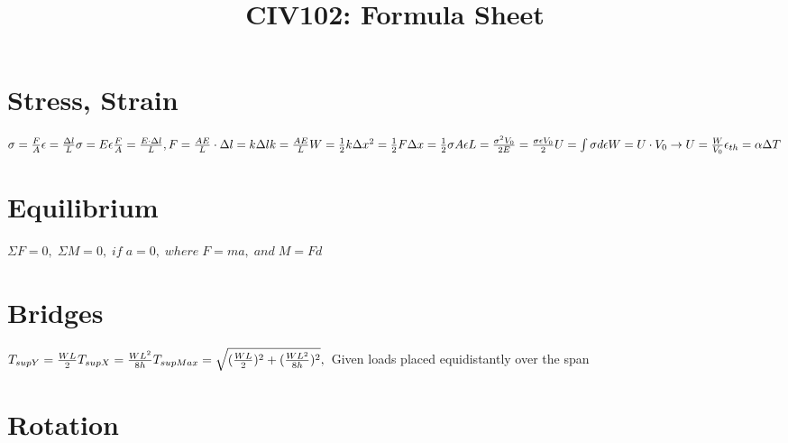 \documentclass{article}
\begin{document}
    \title{CIV102: Formula Sheet}

    \section{Stress, Strain}
        \begin{math} 
            \sigma = \frac{F}{A} \\
            \epsilon = \frac{\Delta l}{L} \\
            \sigma = E\epsilon  \\
            \frac{F}{A} = \frac{E \cdot \Delta l}{L}, F = \frac{AE}{L} \cdot \Delta l = k \Delta l  \\
            k = \frac{AE}{L}  \\
            W = \frac{1}{2}k\Delta x^2 
            = \frac{1}{2} F\Delta x 
            = \frac{1}{2} \sigma A \epsilon L 
            = \frac{\sigma^2 V_0}{2E} 
            = \frac{\sigma \epsilon V_0}{2}\\ 
            U = \int \sigma d\epsilon \\
            W = U \cdot V_0 \rightarrow U = \frac{W}{V_0} \\
            \epsilon_{th} = \alpha \Delta T 
        \end{math}

    \section{Equilibrium}  
        \begin{math}
            \Sigma F = 0,\;\Sigma M = 0,\;if\;a = 0,\;where\;F = ma,\;and\;M = Fd
        \end{math}
    
    \section{Bridges}
        \begin{math}
            T_{supY}=\frac{WL}{2} \\
            T_{supX}=\frac{WL^{2}}{8h} \\
            T_{supMax}=\sqrt{(\frac{WL}{2})^{2} + (\frac{WL^{2}}{8h})^2}, \\
        \end{math}
        Given loads placed equidistantly over the span

    \section{Rotation}
\end{document}
